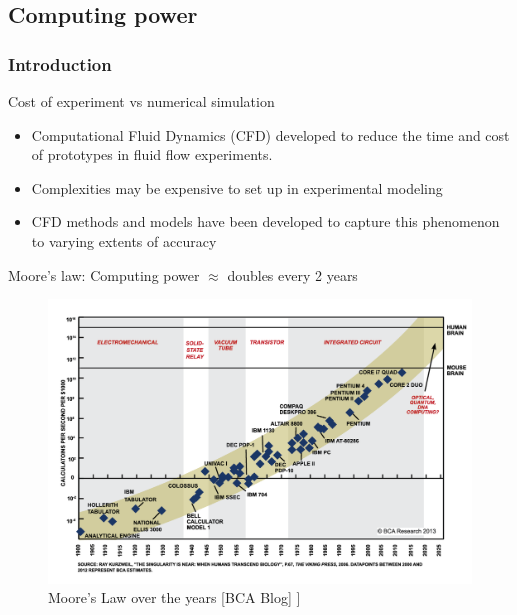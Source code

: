 \documentclass{beamer}
\begin{document}
\subsection{Computing power}
\begin{frame}%
\frametitle{Introduction}
\vspace{-6pt}
\scriptsize 
Cost of experiment vs numerical simulation
\begin{itemize}
\tiny
\item Computational Fluid Dynamics (CFD) developed to reduce the time and cost of prototypes in fluid flow experiments. 
\item Complexities may be expensive to set up in experimental modeling
\item CFD methods and models have been developed to capture this phenomenon to varying extents of accuracy
\end{itemize}
Moore's law: Computing power $\approx$ doubles every 2 years
\vspace{-1mm}
\begin{figure}[h!]
\includegraphics[height=0.47\textwidth, trim=0cm 1.2cm 0 1.2cm,clip=true]{./figs/MooresLaw.png}
\caption{Moore's Law over the years [BCA Blog] \cite{MooreLaw}]}
\label{fig:Moore}
\end{figure}
\end{frame}

\end{document}
